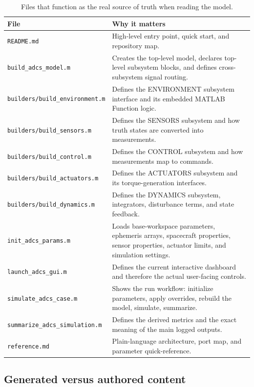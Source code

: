\documentclass[11pt]{article}
\begin{document}
\begin{table}[H]
\centering
\begin{tabularx}{\textwidth}{@{}lY@{}}
\toprule
\textbf{File} & \textbf{Why it matters} \\
\midrule
\texttt{README.md} & High-level entry point, quick start, and repository map. \\
\texttt{build\_adcs\_model.m} & Creates the top-level model, declares top-level subsystem blocks, and defines cross-subsystem signal routing. \\
\texttt{builders/build\_environment.m} & Defines the ENVIRONMENT subsystem interface and its embedded MATLAB Function logic. \\
\texttt{builders/build\_sensors.m} & Defines the SENSORS subsystem and how truth states are converted into measurements. \\
\texttt{builders/build\_control.m} & Defines the CONTROL subsystem and how measurements map to commands. \\
\texttt{builders/build\_actuators.m} & Defines the ACTUATORS subsystem and its torque-generation interfaces. \\
\texttt{builders/build\_dynamics.m} & Defines the DYNAMICS subsystem, integrators, disturbance terms, and state feedback. \\
\texttt{init\_adcs\_params.m} & Loads base-workspace parameters, ephemeris arrays, spacecraft properties, sensor properties, actuator limits, and simulation settings. \\
\texttt{launch\_adcs\_gui.m} & Defines the current interactive dashboard and therefore the actual user-facing controls. \\
\texttt{simulate\_adcs\_case.m} & Shows the run workflow: initialize parameters, apply overrides, rebuild the model, simulate, summarize. \\
\texttt{summarize\_adcs\_simulation.m} & Defines the derived metrics and the exact meaning of the main logged outputs. \\
\texttt{reference.md} & Plain-language architecture, port map, and parameter quick-reference. \\
\bottomrule
\end{tabularx}
\caption{Files that function as the real source of truth when reading the model.}
\label{tab:source-of-truth-files}
\end{table}

\subsection{Generated versus authored content}
\end{document}
